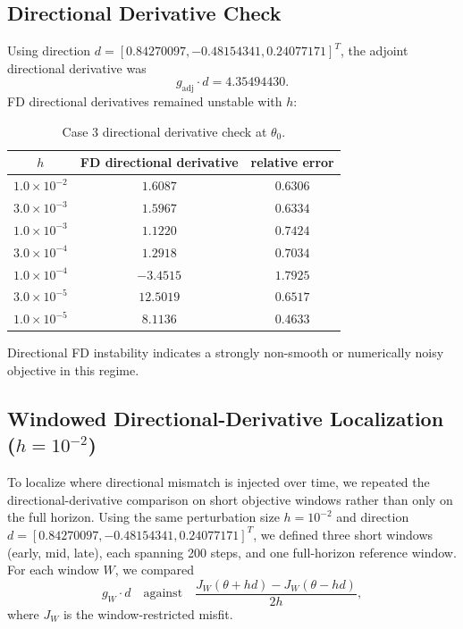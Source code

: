 \documentclass[11pt]{article}
\begin{document}
\subsection{Directional Derivative Check}
Using direction \(d=[0.84270097,-0.48154341,0.24077171]^T\), the adjoint directional derivative was
\[
g_{\mathrm{adj}}\cdot d = 4.35494430.
\]
FD directional derivatives remained unstable with \(h\):
\begin{table}[h!]
\centering
\caption{Case 3 directional derivative check at \(\theta_0\).}
\label{tab:dir}
\begin{tabular}{@{}ccc@{}}
\toprule
\(h\) & FD directional derivative & relative error \\
\midrule
\(1.0\times10^{-2}\) & \(1.6087\) & \(0.6306\) \\
\(3.0\times10^{-3}\) & \(1.5967\) & \(0.6334\) \\
\(1.0\times10^{-3}\) & \(1.1220\) & \(0.7424\) \\
\(3.0\times10^{-4}\) & \(1.2918\) & \(0.7034\) \\
\(1.0\times10^{-4}\) & \(-3.4515\) & \(1.7925\) \\
\(3.0\times10^{-5}\) & \(12.5019\) & \(0.6517\) \\
\(1.0\times10^{-5}\) & \(8.1136\) & \(0.4633\) \\
\bottomrule
\end{tabular}
\end{table}

Directional FD instability indicates a strongly non-smooth or numerically noisy objective in this regime.

\subsection{Windowed Directional-Derivative Localization (\(h=10^{-2}\))}
To localize where directional mismatch is injected over time, we repeated the directional-derivative comparison on short objective windows rather than only on the full horizon.
Using the same perturbation size \(h=10^{-2}\) and direction \(d=[0.84270097,-0.48154341,0.24077171]^T\), we defined three short windows (early, mid, late), each spanning 200 steps, and one full-horizon reference window.
For each window \(W\), we compared
\[
g_W\cdot d
\quad\text{against}\quad
\frac{J_W(\theta+h d)-J_W(\theta-h d)}{2h},
\]
where \(J_W\) is the window-restricted misfit.
\end{document}
